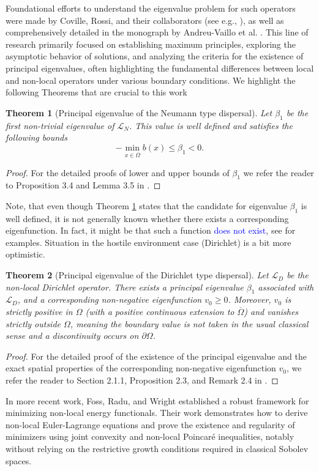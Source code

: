 \documentclass[12pt, a4paper]{article}
\newcommand{\revision}[1]{\textcolor{blue}{#1}}
\theoremstyle{break}
\newtheorem{thm}{Theorem}[section]
\theoremstyle{break}
\theoremstyle{break}
\theoremstyle{break}
\theoremstyle{break}
\theoremstyle{break}
\theoremstyle{break}
\theoremstyle{break}
\theoremstyle{break}
\begin{document}
Foundational efforts to understand the eigenvalue problem for such operators were made by Coville, Rossi, and their collaborators (see e.g., \cite{ChasseigneChavesRossi2006, Coville2010, GarciaMelianRossi2009}), as well as comprehensively detailed in the monograph by Andreu-Vaillo et al. \cite{AndreuVaillo2010}. This line of research primarily focused on establishing maximum principles, exploring the asymptotic behavior of solutions, and analyzing the criteria for the existence of principal eigenvalues, often highlighting the fundamental differences between local and non-local operators under various boundary conditions. We highlight the following Theorems that are crucial to this work
\begin{thm}[Principal eigenvalue of the Neumann type dispersal]
    \label{thm:beta1_bounds}
    Let $\beta_1$ be the first non-trivial eigenvalue of $\mathcal{L}_N$. This value is well defined and satisfies the following bounds
    \begin{equation}
        -\min_{x\in\overline{\Omega}} b(x) \leq \beta_1 < 0.
    \end{equation}
\end{thm}
\begin{proof}
    For the detailed proofs of lower and upper bounds of $\beta_1$ we refer the reader to Proposition 3.4 and Lemma 3.5 in \cite{AndreuVaillo2010}.
\end{proof}
Note, that even though Theorem \ref{thm:beta1_bounds} states that the candidate for eigenvalue $\beta_1$ is well defined, it is not generally known whether there exists a corresponding eigenfunction. In fact, it might be that such a function \revision{does not exist}, see \cite{Coville2010, ShenZhang2010} for examples. Situation in the hostile environment case (Dirichlet) is a bit more optimistic.
\begin{thm}[Principal eigenvalue of the Dirichlet type dispersal]
    \label{thm:dirichlet_principal_eigenvalue}
    Let $\mathcal{L}_D$ be the non-local Dirichlet operator. There exists a principal eigenvalue $\beta_1$ associated with $\mathcal{L}_D$, and a corresponding non-negative eigenfunction $v_0 \ge 0$. Moreover, $v_0$ is strictly positive in $\Omega$ (with a positive continuous extension to $\overline{\Omega}$) and vanishes strictly outside $\Omega$, meaning the boundary value is not taken in the usual classical sense and a discontinuity occurs on $\partial\Omega$.
\end{thm}
\begin{proof}
    For the detailed proof of the existence of the principal eigenvalue and the exact spatial properties of the corresponding non-negative eigenfunction $v_0$, we refer the reader to Section 2.1.1, Proposition 2.3, and Remark 2.4 in \cite{AndreuVaillo2010}.
\end{proof}
In more recent work, Foss, Radu, and Wright \cite{FossRaduWright2018} established a robust framework for minimizing non-local energy functionals. Their work demonstrates how to derive non-local Euler-Lagrange equations and prove the existence and regularity of minimizers using joint convexity and non-local Poincar\'e inequalities, notably without relying on the restrictive growth conditions required in classical Sobolev spaces.
\end{document}
